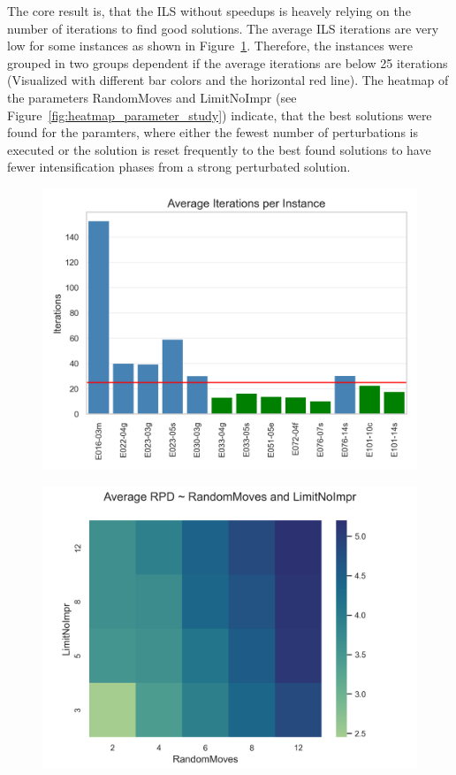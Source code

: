 The core result is, that the \gls{ILS} without speedups is heavely relying on the number of iterations to find good
solutions. The average \gls{ILS} iterations are very low for some instances as shown in Figure~\ref{fig:average_iterations_noclassifier}.
Therefore, the instances were grouped in two groups dependent if the average iterations are below 25 iterations (Visualized with different bar
colors and the horizontal red line). The heatmap of the parameters RandomMoves and LimitNoImpr (see Figure~\ref{fig:heatmap_parameter_study}) indicate, that the best solutions
were found for the paramters, where either the fewest number of perturbations is executed or the solution is reset frequently to the best found
solutions to have fewer intensification phases from a strong perturbated solution.

\begin{figure}[ht]
    \centering
    \begin{minipage}[t]{0.49\textwidth}
        \centering
        \includegraphics[width=\linewidth]{pictures/iterations_per_instance.png}
        \label{fig:average_iterations_noclassifier}
    \end{minipage}\hfill
    \begin{minipage}[t]{0.49\textwidth}
        \centering
        \includegraphics[width=\linewidth]{pictures/heatmap_randomMoves_limitNoImpr.png}

\end{minipage}
\end{figure}
